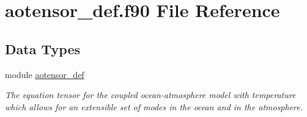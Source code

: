 \hypertarget{aotensor__def_8f90}{\section{aotensor\-\_\-def.\-f90 File Reference}
\label{aotensor__def_8f90}
}
\subsection*{Data Types}
\begin{DoxyCompactItemize}
\item 
module \hyperlink{classaotensor__def}{aotensor\-\_\-def}
\begin{DoxyCompactList}\small\item\em The equation tensor for the coupled ocean-\/atmosphere model with temperature which allows for an extensible set of modes in the ocean and in the atmosphere. \end{DoxyCompactList}\end{DoxyCompactItemize}
